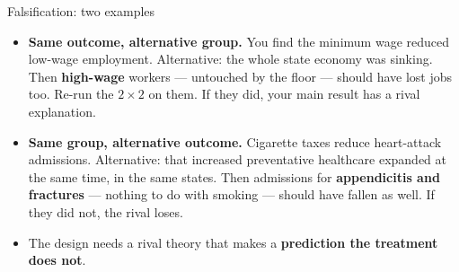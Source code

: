 \documentclass[
  11pt,
  ignorenonframetext,
  aspectratio=169,
]{beamer}
\providecommand{\tightlist}{%
  \setlength{\itemsep}{0pt}\setlength{\parskip}{0pt}}
\begin{document}
\begin{frame}{Falsification: two examples}
\protect{}\label{falsification-two-examples}
\begin{itemize}
\tightlist
\item
  \textbf{Same outcome, alternative group.} You find the minimum wage
  reduced low-wage employment. Alternative: the whole state economy was
  sinking. Then \textbf{high-wage} workers --- untouched by the floor
  --- should have lost jobs too. Re-run the \(2 \times 2\) on them. If
  they did, your main result has a rival explanation.
\item
  \textbf{Same group, alternative outcome.} Cigarette taxes reduce
  heart-attack admissions. Alternative: that increased preventative
  healthcare expanded at the same time, in the same states. Then
  admissions for \textbf{appendicitis and fractures} --- nothing to do
  with smoking --- should have fallen as well. If they did not, the
  rival loses.
\end{itemize}

\vspace{0.3em}

\begin{itemize}
\tightlist
\item
  The design needs a rival theory that makes a \textbf{prediction the
  treatment does not}.
\end{itemize}
\end{frame}
\end{document}
